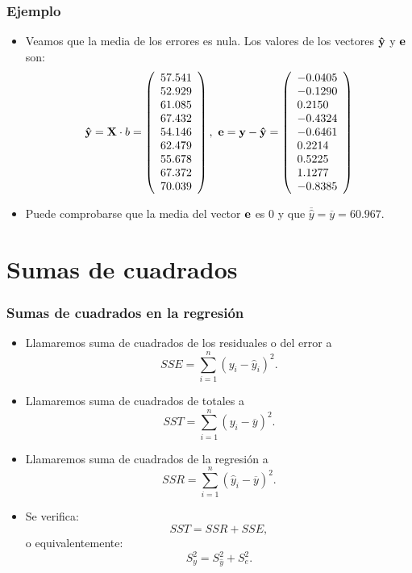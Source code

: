 \begin{frame}
\frametitle{Ejemplo}
\begin{itemize}
\item<2->{Veamos que la media de los errores es nula.
Los valores de los vectores $\mathbf{\hat{y}}$ y $\mathbf{e}$ son:
$$
\vect{\hat{y}}=\vect{X}\cdot b =  \left(\begin{array}{l}
 57.541 \\  52.929 \\  61.085 \\ 67.432 \\ 54.146 \\  62.479 \\ 55.678  \\   67.372 \\ 70.039      \end{array}\right),\ \vect{e}=\vect{y}-\vect{\hat{y}}=\left(\begin{array}{l}
    -0.0405\\ -0.1290\\ 0.2150\\ -0.4324 \\ -0.6461 \\ 0.2214 \\ 0.5225 \\ 
 1.1277\\ -0.8385 \end{array}\right)
$$}
\item<3->{Puede comprobarse que la media del vector $\mathbf{e}$ es $0$ y que $\overline{\hat{y}}=\overline{y}=60.967$.}
\end{itemize}
\end{frame}


\section{Sumas de cuadrados}
\begin{frame}
\frametitle{Sumas de cuadrados en la regresión}
\begin{itemize}
\item<2->{Llamaremos suma de cuadrados de los residuales o del error a
$$SSE=\sum_{i=1}^n (y_i-\hat{y}_i)^2.$$}
\item<3->{Llamaremos suma de cuadrados de totales a 
$$SST=\sum_{i=1}^n (y_i-\overline{y})^2.$$}
\item<4->{Llamaremos suma de
cuadrados de la regresión a
$$SSR=\sum_{i=1}^n(\hat{y}_i-\overline{y})^2.$$}
\item<5->{Se verifica:
$$SST=SSR+SSE,$$
o equivalentemente:
$$S^2_y=S^2_{\hat{y}}+S^2_e.$$}
\end{itemize}
\end{frame}

